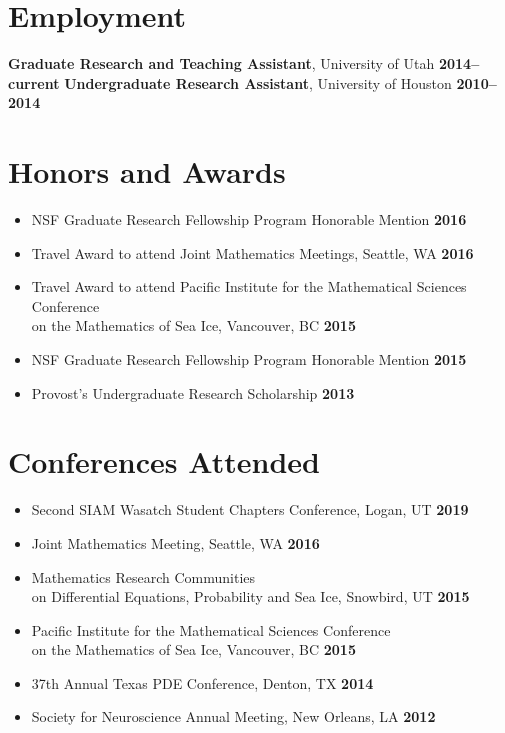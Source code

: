 \documentclass[margin,line]{res}
\begin{document}
\begin{resume}
\section{\sc Employment}
{\bf Graduate Research and Teaching Assistant}, University of Utah \hfill {\bf 2014--current}
{\bf Undergraduate Research Assistant}, University of Houston \hfill {\bf 2010--2014}

\section{\sc Honors and Awards}
\begin{itemize}
    \item[] NSF Graduate Research Fellowship Program Honorable Mention \hfill {\bf 2016}
    \item[] Travel Award to attend Joint Mathematics Meetings, Seattle, WA \hfill {\bf 2016}
    \item[] Travel Award to attend Pacific Institute for the Mathematical Sciences Conference\\ on the Mathematics of Sea Ice, Vancouver, BC \hfill {\bf 2015}
    \item[] NSF Graduate Research Fellowship Program Honorable Mention \hfill {\bf 2015}
    \item[] Provost's Undergraduate Research Scholarship \hfill {\bf 2013}
\end{itemize}
\ifx\nopubs\undefined

\else
\fi

\section{\sc Conferences Attended}
\begin{itemize}
\item[] Second SIAM Wasatch Student Chapters Conference, Logan, UT
\hfill {\bf 2019}
\item[] Joint Mathematics Meeting, Seattle, WA
\hfill {\bf 2016}
\item[] Mathematics Research Communities \\ on Differential Equations, Probability and Sea Ice, Snowbird, UT
 \hfill {\bf 2015}
\item[] Pacific Institute for the Mathematical Sciences Conference \\ on the Mathematics of Sea Ice, Vancouver, BC
  \hfill {\bf 2015}
\item[] 37th Annual Texas PDE Conference, Denton, TX
\hfill {\bf 2014}
\item[] Society for Neuroscience Annual Meeting, New Orleans, LA
\hfill {\bf 2012}
\end{itemize}


\end{resume}
\end{document}
